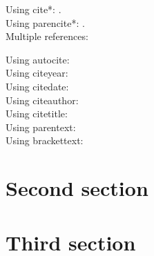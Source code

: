 Using cite*: \cite*{RN4}.\\

Using parencite*: \parencite*{RN4}.\\

Multiple references: \parencites[35]{RN4}[88--120]{RN6}[23]{RN3} %

Using autocite: \autocite[prenote][postnote]{RN4}\\

Using citeyear: \citeyear{RN4}\\

Using citedate: \\

Using citeauthor: \citeauthor{RN4}\\
 
Using citetitle: \\

Using parentext: \\

Using brackettext: \\

\section{Second section}
\section{Third section}